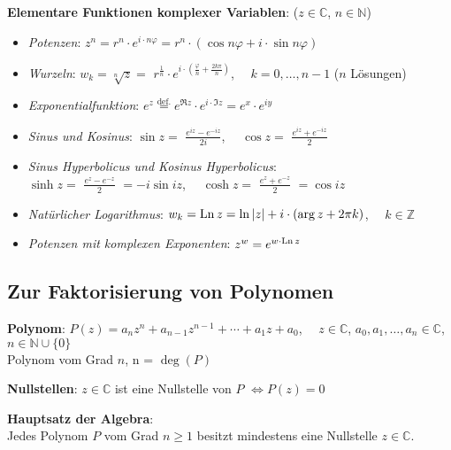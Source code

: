 \textbf{Elementare Funktionen komplexer Variablen}:
($z \in \mathbb{C}$, $n \in \mathbb{N}$)
\begin{itemize}
    \item \emph{Potenzen}: $z^n = r^n \cdot e^{i \cdot n\varphi} =
    r^n \cdot (\cos{n \varphi} + i \cdot \sin{n \varphi})$

    \item \emph{Wurzeln}: $w_k = \sqrt[n]{z} =$
    {\Large $r^{\frac{1}{n}} \cdot
    e^{i \cdot (\frac{\varphi}{n} + \frac{2k\pi}{n})}$},
    $\quad k = 0, \ldots, n-1$ ($n$ Lösungen)

    \item \emph{Exponentialfunktion}: $e^z \overset{\text{def.}}{=}
    e^{\Re{z}} \cdot e^{i \cdot \Im{z}} =
    e^x \cdot e^{iy}$

    \item \emph{Sinus und Kosinus}:
    $\sin{z} =$ {\Large $\frac{e^{iz} - e^{-iz}}{2i}$},
    $\quad \cos{z} =$ {\Large $\frac{e^{iz} + e^{-iz}}{2}$}

    \item \emph{Sinus Hyperbolicus und Kosinus Hyperbolicus}: \\
    $\sinh{z} =$ {\Large $\frac{e^{z} - e^{-z}}{2}$} $= -i \sin{iz}$,
    $\quad \cosh{z} =$ {\Large $\frac{e^{z} + e^{-z}}{2}$} $= \cos{iz}$

    \item \emph{Natürlicher Logarithmus}: $w_k = \operatorname{Ln}{z} =
    \ln{|z|} + i \cdot (\arg{z} + 2 \pi k)$, $\quad k \in \mathbb{Z}$

    \item \emph{Potenzen mit komplexen Exponenten}: $z^w = e^{w \cdot \operatorname{Ln}{z}}$
\end{itemize}

\pagebreak

\subsection{%
    Zur Faktorisierung von Polynomen%
}

\textbf{Polynom}: $P(z) = a_n z^n + a_{n-1} z^{n-1} + \cdots + a_1 z + a_0$,
$\quad z \in \mathbb{C}$, $a_0, a_1, \ldots, a_n \in \mathbb{C}$,
$n \in \mathbb{N} \cup \{0\}$ \\
Polynom vom Grad $n$, n = $\deg(P)$

\textbf{Nullstellen}: $z \in \mathbb{C}$ ist eine Nullstelle von $P$
$\Leftrightarrow P(z) = 0$

\textbf{Hauptsatz der Algebra}: \\
Jedes Polynom $P$ vom Grad $n \ge 1$ besitzt
mindestens eine Nullstelle $z \in \mathbb{C}$.

